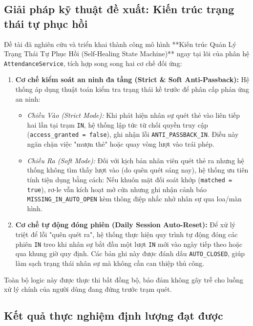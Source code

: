 \documentclass[../DoAn.tex]{subfiles}
\begin{document}
\subsection{Giải pháp kỹ thuật đề xuất: Kiến trúc trạng thái tự phục hồi}

Đề tài đã nghiên cứu và triển khai thành công mô hình **Kiến trúc Quản Lý Trạng Thái Tự Phục Hồi (Self-Healing State Machine)** ngay tại lõi của phân hệ \texttt{AttendanceService}, tích hợp song song hai cơ chế đối ứng:

\begin{enumerate}
    \item \textbf{Cơ chế kiểm soát an ninh đa tầng (Strict \& Soft Anti-Passback):} 
    Hệ thống áp dụng thuật toán kiểm tra trạng thái kề trước để phân cấp phản ứng an ninh:
    \begin{itemize}
        \item \textit{Chiều Vào (Strict Mode):} Khi phát hiện nhân sự quét thẻ vào liên tiếp hai lần tại trạm \texttt{IN}, hệ thống lập tức từ chối quyền truy cập (\texttt{access_granted = false}), ghi nhận lỗi \texttt{ANTI_PASSBACK_IN}. Điều này ngăn chặn việc "mượn thẻ" hoặc quay vòng lượt vào trái phép.
        \item \textit{Chiều Ra (Soft Mode):} Đối với kịch bản nhân viên quét thẻ ra nhưng hệ thống không tìm thấy lượt vào (do quên quét sáng nay), hệ thống ưu tiên tính tiện dụng bằng cách: Nếu khuôn mặt đối soát khớp (\texttt{matched = true}), rơ-le vẫn kích hoạt mở cửa nhưng ghi nhận cảnh báo \texttt{MISSING_IN_AUTO_OPEN} kèm thông điệp nhắc nhở nhân sự qua loa/màn hình.
    \end{itemize}
    
    \item \textbf{Cơ chế tự động đóng phiên (Daily Session Auto-Reset):}
    Để xử lý triệt để lỗi "quên quét ra", hệ thống thực hiện quy trình tự động đóng các phiên \texttt{IN} treo khi nhân sự bắt đầu một lượt \texttt{IN} mới vào ngày tiếp theo hoặc qua khung giờ quy định. Các bản ghi này được đánh dấu \texttt{AUTO_CLOSED}, giúp làm sạch trạng thái nhân sự mà không cần can thiệp thủ công.
\end{enumerate}

Toàn bộ logic này được thực thi bất đồng bộ, bảo đảm không gây trễ cho luồng xử lý chính của người dùng đang đứng trước trạm quét.

\subsection{Kết quả thực nghiệm định lượng đạt được}
\end{document}
